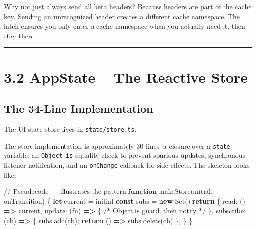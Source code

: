 \documentclass[
  english,
  11pt,
  letterpaper,
]{book}
\newenvironment{Shaded}{\begin{snugshade}}{\end{snugshade}}
\newcommand{\BuiltInTok}[1]{\textcolor[rgb]{0.00,0.23,0.31}{#1}}
\newcommand{\CommentTok}[1]{\textcolor[rgb]{0.37,0.37,0.37}{#1}}
\newcommand{\ControlFlowTok}[1]{\textcolor[rgb]{0.00,0.23,0.31}{\textbf{#1}}}
\newcommand{\FunctionTok}[1]{\textcolor[rgb]{0.28,0.35,0.67}{#1}}
\newcommand{\KeywordTok}[1]{\textcolor[rgb]{0.00,0.23,0.31}{\textbf{#1}}}
\newcommand{\NormalTok}[1]{\textcolor[rgb]{0.00,0.23,0.31}{#1}}
\newcommand{\OperatorTok}[1]{\textcolor[rgb]{0.37,0.37,0.37}{#1}}
\begin{document}
Why not just always send all beta headers? Because headers are part of
the cache key. Sending an unrecognized header creates a different cache
namespace. The latch ensures you only enter a cache namespace when you
actually need it, then stay there.

\begin{center}\rule{0.5\linewidth}{0.5pt}\end{center}

\section{3.2 AppState -- The Reactive
Store}\label{appstate-the-reactive-store}

\subsection{The 34-Line
Implementation}\label{the-34-line-implementation}

The UI state store lives in \texttt{state/store.ts}:

The store implementation is approximately 30 lines: a closure over a
\texttt{state} variable, an \texttt{Object.is} equality check to prevent
spurious updates, synchronous listener notification, and an
\texttt{onChange} callback for side effects. The skeleton looks like:

\begin{Shaded}
\begin{Highlighting}[]
\CommentTok{// Pseudocode — illustrates the pattern}
\KeywordTok{function} \FunctionTok{makeStore}\NormalTok{(initial}\OperatorTok{,}\NormalTok{ onTransition) \{}
  \KeywordTok{let}\NormalTok{ current }\OperatorTok{=}\NormalTok{ initial}
  \KeywordTok{const}\NormalTok{ subs }\OperatorTok{=} \KeywordTok{new} \BuiltInTok{Set}\NormalTok{()}
  \ControlFlowTok{return}\NormalTok{ \{}
\NormalTok{    read}\OperatorTok{:}\NormalTok{      () }\KeywordTok{=\textgreater{}}\NormalTok{ current}\OperatorTok{,}
\NormalTok{    update}\OperatorTok{:}\NormalTok{    (fn) }\KeywordTok{=\textgreater{}}\NormalTok{ \{ }\CommentTok{/* Object.is guard, then notify */}\NormalTok{ \}}\OperatorTok{,}
\NormalTok{    subscribe}\OperatorTok{:}\NormalTok{ (cb) }\KeywordTok{=\textgreater{}}\NormalTok{ \{ subs}\OperatorTok{.}\FunctionTok{add}\NormalTok{(cb)}\OperatorTok{;} \ControlFlowTok{return}\NormalTok{ () }\KeywordTok{=\textgreater{}}\NormalTok{ subs}\OperatorTok{.}\FunctionTok{delete}\NormalTok{(cb) \}}\OperatorTok{,}
\NormalTok{  \}}
\NormalTok{\}}
\end{Highlighting}
\end{Shaded}
\end{document}

